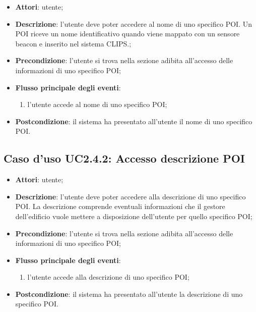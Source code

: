 \documentclass[../AnalisiDeiRequisiti.tex]{subfiles}
\begin{document}
\begin{itemize}
\item \textbf{Attori}: utente;
\item \textbf{Descrizione}: l'utente deve poter accedere al nome di uno specifico POI. Un POI riceve un nome identificativo quando viene mappato con un sensore beacon e inserito nel sistema CLIPS.; 
      \item \textbf{Precondizione}: l'utente si trova nella sezione adibita all'accesso delle informazioni di uno specifico POI;

        \item \textbf{Flusso principale degli eventi}:
          \begin{enumerate}
          \item l'utente accede al nome di uno specifico POI;

      \end{enumerate}
    \item \textbf{Postcondizione}: il sistema ha presentato all'utente il nome di uno specifico POI.
  \end{itemize}
\hypertarget{UC2.4.2}{}
\subsection{Caso d'uso UC2.4.2: Accesso descrizione POI}
\begin{itemize}
\item \textbf{Attori}: utente;
\item \textbf{Descrizione}: l'utente deve poter accedere alla descrizione di uno specifico POI. La descrizione comprende eventuali informazioni che il gestore dell'edificio vuole mettere a disposizione dell'utente per quello specifico POI; 
      \item \textbf{Precondizione}: l'utente si trova nella sezione adibita all'accesso delle informazioni di uno specifico POI;

        \item \textbf{Flusso principale degli eventi}:
          \begin{enumerate}
          \item l'utente accede alla descrizione di uno specifico POI;

      \end{enumerate}
    \item \textbf{Postcondizione}: il sistema ha presentato all'utente la descrizione di uno specifico POI.
  \end{itemize}
\hypertarget{UC3}{}
\end{document}
